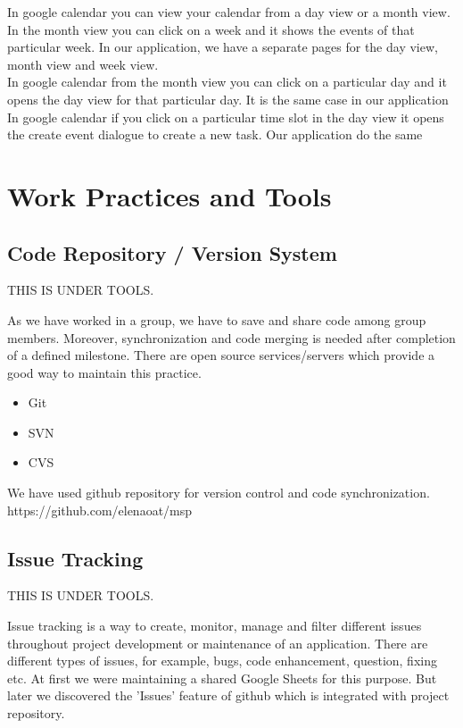 \documentclass[10pt,a4paper]{report}
\begin{document}
In google calendar you can view your calendar from a day view or a month view. In the month view you can click on a week and it shows the events of that particular week. In our application, we have a separate pages for the day view, month view and week view.\\

In google calendar from the month view you can click on a particular day and it opens the day view for that particular day. It is the same case in our application \\

In google calendar if you click on a particular time slot in the day view it opens the create event dialogue to create a new task. Our application do the same

\chapter{Work Practices and Tools}

\section{Code Repository / Version System}

{\color{red}THIS IS UNDER TOOLS.}

As we have worked in a group, we have to save and share code among group members. Moreover, synchronization and code merging is needed after completion of a defined milestone. There are open source services/servers which provide a good way to maintain this practice.

\begin{itemize}
	\item Git
	\item SVN
	\item CVS
\end{itemize}

We have used github repository for version control and code synchronization. https://github.com/elenaoat/msp

\section{Issue Tracking}

{\color{red}THIS IS UNDER TOOLS.}

Issue tracking is a way to create, monitor, manage and filter different issues throughout project development or maintenance of an application. There are different types of issues, for example, bugs, code enhancement, question, fixing etc. At first we were maintaining a shared Google Sheets for this purpose. But later we discovered the 'Issues' feature of github which is integrated with project repository.
\end{document}
